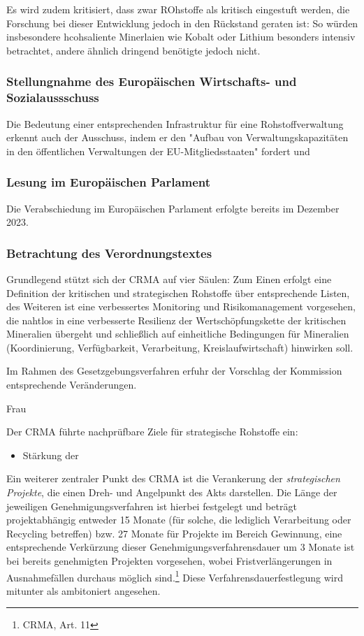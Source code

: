 \documentclass[12pt,a4paper,oneside]{book} %
\begin{document}
Es wird zudem kritisiert, dass zwar ROhstoffe als kritisch eingestuft werden, die Forschung bei dieser Entwicklung jedoch in den Rückstand geraten ist: So würden insbesondere hcohsaliente Minerlaien wie Kobalt oder Lithium besonders intensiv betrachtet, andere ähnlich dringend benötigte jedoch nicht.\autocite{ÖAW, Studie EP}


\subsubsection{Stellungnahme des Europäischen Wirtschafts- und Sozialaussschuss}

Die Bedeutung einer entsprechenden Infrastruktur für eine Rohstoffverwaltung erkennt auch der Ausschuss, indem er den "Aufbau von Verwaltungskapazitäten in den öffentlichen Verwaltungen der EU-Mitgliedsstaaten" fordert %
und 

\subsubsection{Lesung im Europäischen Parlament}


Die Verabschiedung im Europäischen Parlament erfolgte bereits im Dezember 2023.

\subsubsection{Betrachtung des Verordnungstextes}
Grundlegend stützt sich der CRMA auf vier Säulen: Zum Einen erfolgt eine Definition der kritischen und strategischen Rohstoffe über entsprechende Listen, des Weiteren ist eine verbessertes Monitoring und Risikomanagement vorgesehen, die nahtlos in eine verbesserte Resilienz der Wertschöpfungskette der kritischen Mineralien übergeht und schließlich auf einheitliche Bedingungen für Mineralien (Koordinierung, Verfügbarkeit, Verarbeitung, Kreislaufwirtschaft) hinwirken soll.

Im Rahmen des Gesetzgebungsverfahren erfuhr der Vorschlag der Kommission entsprechende Veränderungen.

Frau\autocite{Frau, NVwZ 2024, 1874}


Der CRMA führte nachprüfbare Ziele für strategische Rohstoffe ein:
\begin{itemize}
	\item Stärkung der 
\end{itemize}


Ein weiterer zentraler Punkt des CRMA ist die Verankerung der \textit{strategischen Projekte}, die einen Dreh- und Angelpunkt des Akts darstellen.
Die Länge der jeweiligen Genehmigungsverfahren ist hierbei festgelegt und beträgt projektabhängig entweder 15 Monate (für solche, die lediglich Verarbeitung oder Recycling betreffen) bzw. 27 Monate für Projekte im Bereich Gewinnung, eine entsprechende Verkürzung dieser Genehmigungsverfahrensdauer um 3 Monate ist bei bereits genehmigten Projekten vorgesehen, wobei Fristverlängerungen in Ausnahmefällen durchaus möglich sind.\footnote{CRMA, Art. 11} Diese Verfahrensdauerfestlegung wird mitunter als ambitoniert angesehen.\autocite{Quantz, ZfPC 2024, 1}
\end{document}
